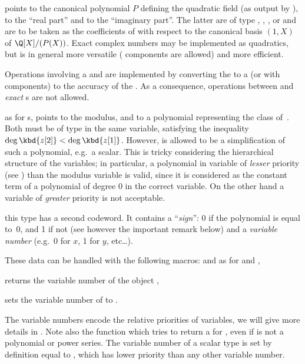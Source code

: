  points to the canonical
polynomial $P$ defining the quadratic field (as output by ),
 to the ``real part'' and  to the ``imaginary part''. The
latter are of type , , , or  and
are to be taken as the coefficients of  with respect to the canonical
basis $(1,X)$ of $\Q[X]/(P(X))$. Exact complex numbers may be implemented as
quadratics, but  is in general more versatile (
components are allowed) and more efficient.

Operations involving a  and  are implemented by
converting the  to a  (or  with 
components) to the accuracy of the . As a consequence,
operations between  and \emph{exact} s are not allowed.

as for s,  points to the modulus, and 
to a polynomial representing the class of~. Both must be of type
 in the same variable, satisfying the inequality $\deg \kbd{z[2]}
< \deg \kbd{z[1]}$. However,  is allowed to be a simplification
of such a polynomial, e.g.~a scalar. This is tricky considering the
hierarchical structure of the variables; in particular, a polynomial in
variable of \emph{lesser} priority (see ) than the
modulus variable is valid, since it is considered as the constant term of
a polynomial of degree 0 in the correct variable. On the other hand a
variable of \emph{greater} priority is not acceptable.

 this
type has a second codeword. It contains a ``\emph{sign}'': 0 if the
polynomial is equal to~0, and 1 if not (see however the important remark
below) and a \emph{variable number} (e.g.~0 for $x$, 1 for $y$, etc\dots).

\noindent These data can be handled with the following macros: 
and  as for  and ,

 returns the variable number of the object ,

 sets the variable number of  to
.

The variable numbers encode the relative priorities of variables, we will
give more details in . Note also the function
 which tries to return a  for
, even if  is not a polynomial or power series. The variable
number of a scalar type is set by definition equal to ,
which has lower priority than any other variable number.

